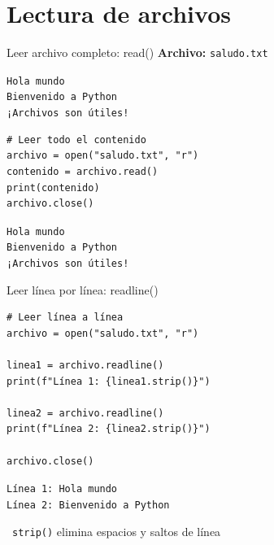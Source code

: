 \documentclass{beamer}
\begin{document}
\section{Lectura de archivos}

\begin{frame}[fragile]{Leer archivo completo: read() \faBookReader}
\textbf{Archivo:} \texttt{saludo.txt}
\begin{tcolorbox}[colback=bg1,colframe=brown,left=3pt,right=3pt,top=2pt,bottom=2pt]
\small\texttt{Hola mundo\\
Bienvenido a Python\\
¡Archivos son útiles!}
\end{tcolorbox}

\vspace{0.2cm}
\begin{lstlisting}
# Leer todo el contenido
archivo = open("saludo.txt", "r")
contenido = archivo.read()
print(contenido)
archivo.close()
\end{lstlisting}

\vspace{-0.2cm}
\begin{tcolorbox}[colback=green!10,colframe=green,title={\small\faArrowCircleRight \ Salida},coltitle=fg0,left=3pt,right=3pt,top=2pt,bottom=2pt,boxsep=1pt]
\small\texttt{Hola mundo\\
Bienvenido a Python\\
¡Archivos son útiles!}
\end{tcolorbox}
\end{frame}

\begin{frame}[fragile]{Leer línea por línea: readline() \faStream}
\begin{lstlisting}
# Leer línea a línea
archivo = open("saludo.txt", "r")

linea1 = archivo.readline()
print(f"Línea 1: {linea1.strip()}")

linea2 = archivo.readline()
print(f"Línea 2: {linea2.strip()}")

archivo.close()
\end{lstlisting}

\vspace{-0.2cm}
\begin{tcolorbox}[colback=green!10,colframe=green,title={\small\faArrowCircleRight \ Salida},coltitle=fg0,left=3pt,right=3pt,top=2pt,bottom=2pt,boxsep=1pt]
\small\texttt{Línea 1: Hola mundo\\
Línea 2: Bienvenido a Python}
\end{tcolorbox}

\vspace{-0.1cm}
\begin{notebox}
\small\faInfoCircle\ \texttt{strip()} elimina espacios y saltos de línea
\end{notebox}
\end{frame}
\end{document}
